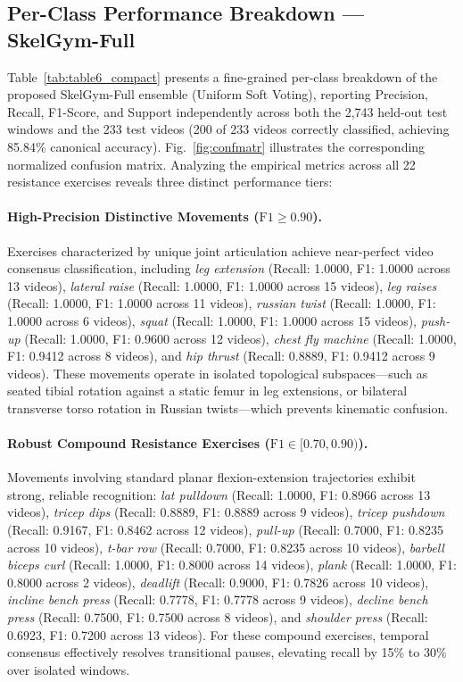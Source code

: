\documentclass[preprint,12pt]{elsarticle}
\begin{document}
\subsection{Per-Class Performance Breakdown — SkelGym-Full}
\label{sec:per_class_breakdown}

Table~\ref{tab:table6_compact} presents a fine-grained per-class breakdown of the proposed SkelGym-Full ensemble (Uniform Soft Voting), reporting Precision, Recall, F1-Score, and Support independently across both the 2,743 held-out test windows and the 233 test videos (200 of 233 videos correctly classified, achieving 85.84\% canonical accuracy). Fig.~\ref{fig:confmatr} illustrates the corresponding normalized confusion matrix. Analyzing the empirical metrics across all 22 resistance exercises reveals three distinct performance tiers:

\paragraph{High-Precision Distinctive Movements ($\text{F1} \ge 0.90$).} Exercises characterized by unique joint articulation achieve near-perfect video consensus classification, including \textit{leg extension} (Recall: 1.0000, F1: 1.0000 across 13 videos), \textit{lateral raise} (Recall: 1.0000, F1: 1.0000 across 15 videos), \textit{leg raises} (Recall: 1.0000, F1: 1.0000 across 11 videos), \textit{russian twist} (Recall: 1.0000, F1: 1.0000 across 6 videos), \textit{squat} (Recall: 1.0000, F1: 1.0000 across 15 videos), \textit{push-up} (Recall: 1.0000, F1: 0.9600 across 12 videos), \textit{chest fly machine} (Recall: 1.0000, F1: 0.9412 across 8 videos), and \textit{hip thrust} (Recall: 0.8889, F1: 0.9412 across 9 videos). These movements operate in isolated topological subspaces---such as seated tibial rotation against a static femur in leg extensions, or bilateral transverse torso rotation in Russian twists---which prevents kinematic confusion.

\paragraph{Robust Compound Resistance Exercises ($\text{F1} \in [0.70, 0.90)$).} Movements involving standard planar flexion-extension trajectories exhibit strong, reliable recognition: \textit{lat pulldown} (Recall: 1.0000, F1: 0.8966 across 13 videos), \textit{tricep dips} (Recall: 0.8889, F1: 0.8889 across 9 videos), \textit{tricep pushdown} (Recall: 0.9167, F1: 0.8462 across 12 videos), \textit{pull-up} (Recall: 0.7000, F1: 0.8235 across 10 videos), \textit{t-bar row} (Recall: 0.7000, F1: 0.8235 across 10 videos), \textit{barbell biceps curl} (Recall: 1.0000, F1: 0.8000 across 14 videos), \textit{plank} (Recall: 1.0000, F1: 0.8000 across 2 videos), \textit{deadlift} (Recall: 0.9000, F1: 0.7826 across 10 videos), \textit{incline bench press} (Recall: 0.7778, F1: 0.7778 across 9 videos), \textit{decline bench press} (Recall: 0.7500, F1: 0.7500 across 8 videos), and \textit{shoulder press} (Recall: 0.6923, F1: 0.7200 across 13 videos). For these compound exercises, temporal consensus effectively resolves transitional pauses, elevating recall by 15\% to 30\% over isolated windows.
\end{document}
